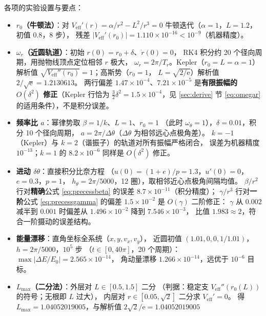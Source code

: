 \documentclass[UTF8,a4paper,11pt]{ctexart}
\begin{document}
各项的实验设置与要点：
\begin{itemize}
  \item \textbf{$r_0$（牛顿法）}：对 $V_{\mathrm{eff}}'(r)=\alpha/r^2-L^2/r^3=0$
        牛顿迭代（$\alpha=1$，$L=1.2$，初值 $0.8$，8 步），
        残差 $|V_{\mathrm{eff}}'(r_0)|=1.110\times10^{-16}<10^{-9}$（机器精度）。
  \item \textbf{$\omega_r$（近圆轨道）}：初始 $r(0)=r_0+\delta$、$\dot r(0)=0$，
        RK4 积分约 20 个径向周期，用抛物线顶点定位相邻 $r$ 极大，
        $\omega_r=2\pi/T_r$。Kepler（$r_0=L=\alpha=1$）解析值
        $\sqrt{V_{\mathrm{eff}}''(r_0)}=1$；高斯势（$r_0=1$，
        $L=\sqrt{2/\mathrm{e}}$）解析值 $2/\sqrt{\mathrm{e}}=1.2130613$。
        两行偏差 $1.47\times10^{-4}$、$7.21\times10^{-5}$
        是\textbf{有限振幅的 $O(\delta^2)$ 修正}（Kepler 行恰为
        $\frac32\delta^2=1.5\times10^{-4}$，见 \ref{sec:derive} 节
        \eqref{eq:omegar} 的适用条件），不是积分误差。
  \item \textbf{频率比 $a$}：幂律势取 $\beta=1/k$、$L=1$、$r_0=1$
        （此时 $\omega_\theta=1$），$\delta=0.01$，积分 10 个径向周期，
        $a=2\pi/\Delta\theta$（$\Delta\theta$ 为相邻远心点极角差）。
        $k=-1$（Kepler）与 $k=2$（谐振子）的轨道对所有振幅严格闭合，
        误差为机器精度 $10^{-13}$；$k=1$ 的 $8.2\times10^{-6}$
        同样是 $O(\delta^2)$ 修正。
  \item \textbf{进动 $\delta\theta$}：直接积分比奈方程
        （$u(0)=(1+e)/p=1.3$，$u'(0)=0$，$e=0.3$，$p=1$，
        $h_\theta=2\pi/5000$，12 圈），取相邻近心点极角间隔均值。
        $\beta/r^2$ 行对\textbf{精确}公式 \eqref{eq:precessbeta}
        的误差 $8.7\times10^{-11}$（积分精度）；
        $\gamma/r^3$ 行对\textbf{一阶}公式 \eqref{eq:precessgamma}
        的偏差 $1.5\times10^{-2}$ 是 $O(\gamma)$ 二阶修正：
        $\gamma$ 从 $0.002$ 减半到 $0.001$ 时偏差从
        $1.496\times10^{-2}$ 降到 $7.546\times10^{-3}$，
        比值 $1.983\approx2$，符合一阶摄动的误差结构。
  \item \textbf{能量漂移}：直角坐标全系统（$x,y,v_x,v_y$），
        近圆初值 $(1.01,0,0,1/1.01)$，$h=2\pi/5000$，$10^5$ 步
        （$t\in[0,40\pi]$，20 个周期）：
        $\max|\Delta E/E_0|=2.565\times10^{-14}$，
        角动量漂移 $1.266\times10^{-14}$，远优于 $10^{-6}$ 目标。
  \item \textbf{$L_{\max}$（二分法）}：外层对 $L\in[0.5,1.5]$ 二分
        （判据：稳定支 $V_{\mathrm{eff}}''(r_0(L))$ 的符号；无根即 $L$ 过大），
        内层对 $r\in[0.05,\sqrt2]$ 二分求 $V_{\mathrm{eff}}'=0$。
        得 $L_{\max}=1.04052019005$，与解析值 $2\sqrt2/\mathrm{e}=1.04052019005$

\end{itemize}
\end{document}
